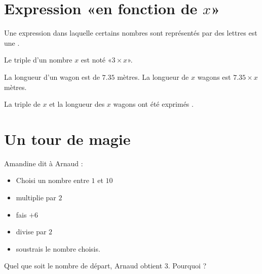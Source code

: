 
\section{Expression «en fonction de \( x\)» }

\begin{definition}
    Une expression dans laquelle certains nombres sont représentés par des lettres est une .
\end{definition}

\begin{example}
    Le triple d'un nombre \( x\) est noté «\( 3\times x\)».
\end{example}

\begin{example}
    La longueur d'un wagon est de \( 7.35\) mètres. La longueur de \( x\) wagons est \( 7.35\times x\) mètres.
\end{example}

La triple de \( x\) et la longueur des \( x\) wagons ont été exprimés .

\section{Un tour de magie}

Amandine dit à Arnaud :
\begin{itemize}
    \item Choisi un nombre entre \( 1\) et \( 10\)
    \item multiplie par \( 2\)
    \item fais \( +6\)
    \item divise par \( 2\)
    \item soustrais le nombre choisis.
\end{itemize}
Quel que soit le nombre de départ, Arnaud obtient \( 3\). Pourquoi ?
